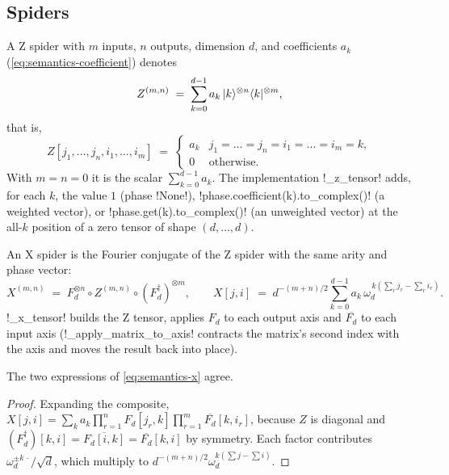 \subsection{Spiders}\label{sec:semantics-denote-spiders}

\begin{definition}[Z spider]\label{def:semantics-z}
A Z spider with $m$ inputs, $n$ outputs, dimension $d$, and coefficients $a_k$ (\cref{eq:semantics-coefficient}) denotes
\begin{equation}\label{eq:semantics-z}
Z^{(m,n)} \;=\; \sum_{k=0}^{d-1} a_k\,\lvert k \rangle^{\otimes n}\langle k \rvert^{\otimes m},
\end{equation}
that is,
\[
Z[j_1,\dots,j_n,i_1,\dots,i_m] \;=\;
\begin{cases} a_k & j_1=\dots=j_n=i_1=\dots=i_m=k,\\ 0 & \text{otherwise.}\end{cases}
\]
With $m=n=0$ it is the scalar $\sum_{k=0}^{d-1}a_k$. The implementation \py!_z_tensor! adds, for each $k$, the value $1$ (phase \py!None!), \py!phase.coefficient(k).to_complex()! (a weighted vector), or \py!phase.get(k).to_complex()! (an unweighted vector) at the all-$k$ position of a zero tensor of shape $(d,\dots,d)$.
\end{definition}

\begin{definition}[X spider]\label{def:semantics-x}
An X spider is the Fourier conjugate of the Z spider with the same arity and phase vector:
\begin{equation}\label{eq:semantics-x}
X^{(m,n)} \;=\; F_d^{\otimes n}\circ Z^{(m,n)}\circ (F_d^\dagger)^{\otimes m},
\qquad
X[j,i] \;=\; d^{-(m+n)/2}\sum_{k=0}^{d-1} a_k\,\omega_d^{\,k\left(\sum_r j_r-\sum_r i_r\right)}.
\end{equation}
\py!_x_tensor! builds the Z tensor, applies $F_d$ to each output axis and $\overline{F_d}$ to each input axis (\py!_apply_matrix_to_axis! contracts the matrix's second index with the axis and moves the result back into place).
\end{definition}

\begin{proposition}\label{prop:semantics-x-closed}
The two expressions of \cref{eq:semantics-x} agree.
\end{proposition}
\begin{proof}
Expanding the composite, $X[j,i]=\sum_{k}a_k\prod_{r=1}^{n}F_d[j_r,k]\prod_{r=1}^{m}\overline{F_d}[k,i_r]$, because $Z$ is diagonal and $(F_d^\dagger)[k,i]=\overline{F_d[i,k]}=\overline{F_d}[k,i]$ by symmetry. Each factor contributes $\omega_d^{\pm k\,\cdot}/\sqrt d$, which multiply to $d^{-(m+n)/2}\omega_d^{k(\sum j-\sum i)}$.
\end{proof}


